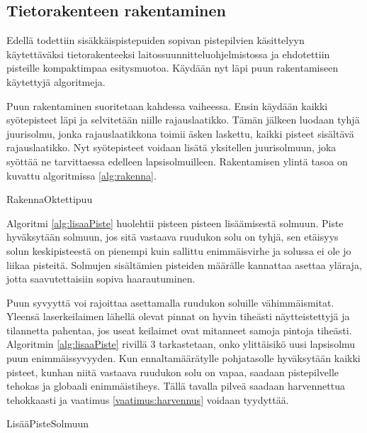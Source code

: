\subsection{Tietorakenteen rakentaminen}

Edellä todettiin sisäkkäispistepuiden sopivan pistepilvien käsittelyyn käytettäväksi tietorakenteeksi laitossuunnitteluohjelmistossa ja ehdotettiin pisteille kompaktimpaa esitysmuotoa. Käydään nyt läpi puun rakentamiseen käytettyjä algoritmeja.

Puun rakentaminen suoritetaan kahdessa vaiheessa. Ensin käydään kaikki syötepisteet läpi ja selvitetään niille rajauslaatikko. Tämän jälkeen luodaan tyhjä juurisolmu, jonka rajauslaatikkona toimii äsken laskettu, kaikki pisteet sisältävä rajauslaatikko. Nyt syötepisteet voidaan lisätä yksitellen juurisolmuun, joka syöttää ne tarvittaessa edelleen lapsisolmuilleen. Rakentamisen ylintä tasoa on kuvattu algoritmissa \ref{alg:rakenna}.

\begin{algorithm}[!h]
    \caption{RakennaOktettipuu}
    \label{alg:rakenna}
    
\end{algorithm}

Algoritmi \ref{alg:lisaaPiste} huolehtii pisteen pisteen lisäämisestä solmuun. Piste hyväksytään solmuun, jos sitä vastaava ruudukon solu on tyhjä, sen etäisyys solun keskipisteestä on pienempi kuin sallittu enimmäisvirhe ja solussa ei ole jo liikaa pisteitä. Solmujen sisältämien pisteiden määrälle kannattaa asettaa yläraja, jotta saavutettaisiin sopiva haarautuminen. %

Puun syvyyttä voi rajoittaa asettamalla ruudukon soluille vähimmäismitat. Yleensä laserkeilaimen lähellä olevat pinnat on hyvin tiheästi näytteistettyjä ja tilannetta pahentaa, jos useat keilaimet ovat mitanneet samoja pintoja tiheästi. Algoritmin \ref{alg:lisaaPiste} rivillä 3 tarkastetaan, onko ylittäisikö uusi lapsisolmu puun enimmäissyvyyden. Kun ennaltamäärätylle pohjatasolle hyväksytään kaikki pisteet, kunhan niitä vastaava ruudukon solu on vapaa, saadaan pistepilvelle tehokas ja globaali enimmäistiheys. Tällä tavalla pilveä saadaan harvennettua tehokkaasti ja vaatimus \ref{vaatimus:harvennus} voidaan tyydyttää. %

\begin{algorithm}[!h]
    \caption{LisääPisteSolmuun}
    \label{alg:lisaaPiste}
    
\end{algorithm}

